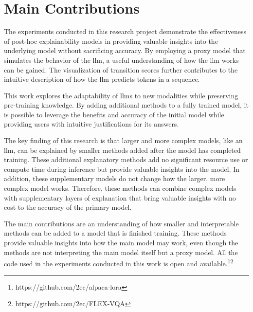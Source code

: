 \label{sec:1_6_main_contributions}

\begin{comment}
It is important to “sell” your work to the reader, making him interested and impressed with your accomplishments. Thus, you should briefly summarize what you have done, list your main results, drawn conclusions and knowledge gained - and put it back in the context of your problem statement. Show how you solved the initial problem or answered the research questions!
\end{comment}

\section{Main Contributions}

The experiments conducted in this research project demonstrate the effectiveness of post-hoc explainability models in providing valuable insights into the underlying model without sacrificing accuracy. 
By employing a proxy model that simulates the behavior of the \gls{llm}, a useful understanding of how the \gls{llm} works can be gained. The visualization of transition scores further contributes to the intuitive description of how the \gls{llm} predicts tokens in a sequence.

This work explores the adaptability of \glspl{llm} to new modalities while preserving pre-training knowledge. By adding additional methods to a fully trained model, it is possible to leverage the benefits and accuracy of the initial model while providing users with intuitive justifications for its answers.

The key finding of this research is that larger and more complex models, like an \gls{llm}, can be explained by smaller methods added after the model has completed training. These additional explanatory methods add no significant resource use or compute time during inference but provide valuable insights into the model. In addition, these supplementary models do not change how the larger, more complex model works. Therefore, these methods can combine complex models with supplementary layers of explanation that bring valuable insights with no cost to the accuracy of the primary model.

The main contributions are an understanding of how smaller and interpretable methods can be added to a model that is finished training. These methods provide valuable insights into how the main model may work, even though the methods are not interpreting the main model itself but a proxy model. 
All the code used in the experiments conducted in this work is open and available.\footnote{https://github.com/2ec/alpaca-lora}\footnote{https://github.com/2ec/FLEX-VQA}

